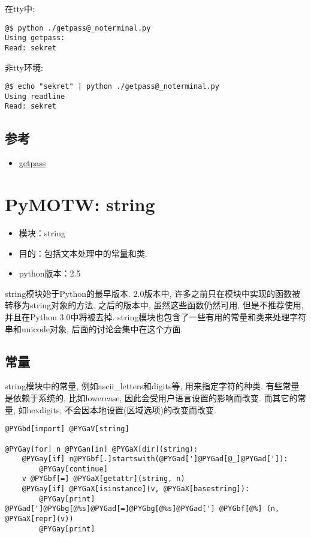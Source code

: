 \documentclass[a4paper,10pt,english]{manual}
\begin{document}
在tty中:

\begin{Verbatim}[commandchars=@\[\]]
@$ python ./getpass@_noterminal.py
Using getpass:
Read: sekret
\end{Verbatim}

非tty环境:

\begin{Verbatim}[commandchars=@\[\]]
@$ echo "sekret" | python ./getpass@_noterminal.py
Using readline
Read: sekret
\end{Verbatim}


\section{参考}
\begin{itemize}
\item {} 
\href{http://docs.python.org/library/getpass.html}{getpass}

\end{itemize}

\resetcurrentobjects


\chapter{PyMOTW: string}
\begin{itemize}
\item {} 
模块：string

\item {} 
目的：包括文本处理中的常量和类.

\item {} 
python版本：2.5

\end{itemize}

string模块始于Python的最早版本. 2.0版本中, 许多之前只在模块中实现的函数被转移为string对象的方法. 之后的版本中, 虽然这些函数仍然可用, 但是不推荐使用, 并且在Python 3.0中将被去掉. string模块也包含了一些有用的常量和类来处理字符串和unicode对象, 后面的讨论会集中在这个方面.


\section{常量}

string模块中的常量, 例如ascii\_letters和digits等, 用来指定字符的种类. 有些常量是依赖于系统的, 比如lowercase, 因此会受用户语言设置的影响而改变. 而其它的常量, 如hexdigits, 不会因本地设置(区域选项)的改变而改变.

\begin{Verbatim}[commandchars=@\[\]]
@PYGbd[import] @PYGaV[string]

@PYGay[for] n @PYGan[in] @PYGaX[dir](string):
    @PYGay[if] n@PYGbf[.]startswith(@PYGad[']@PYGad[@_]@PYGad[']):
        @PYGay[continue]
    v @PYGbf[=] @PYGaX[getattr](string, n)
    @PYGay[if] @PYGaX[isinstance](v, @PYGaX[basestring]):
        @PYGay[print] @PYGad[']@PYGbg[@%s]@PYGad[=]@PYGbg[@%s]@PYGad['] @PYGbf[@%] (n, @PYGaX[repr](v))
        @PYGay[print]
\end{Verbatim}
\end{document}
